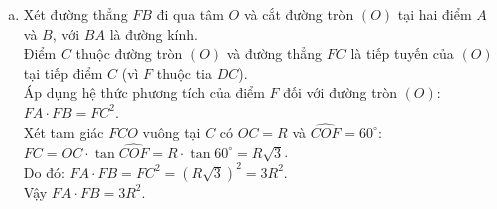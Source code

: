 \begin{bt}
{\begin{enumerate}[a)]
    Từ tính đối xứng và các quan hệ góc trong tam giác $OEF$, đường thẳng $FE$ vuông góc với bán kính tại tiếp điểm trên đường tròn $(O)$, suy ra $FE$ là tiếp tuyến của đường tròn $(O)$.
    \item Xét đường thẳng $FB$ đi qua tâm $O$ và cắt đường tròn $(O)$ tại hai điểm $A$ và $B$, với $BA$ là đường kính.\\
    Điểm $C$ thuộc đường tròn $(O)$ và đường thẳng $FC$ là tiếp tuyến của $(O)$ tại tiếp điểm $C$ (vì $F$ thuộc tia $DC$).\\
    Áp dụng hệ thức phương tích của điểm $F$ đối với đường tròn $(O)$:
    $FA \cdot FB = FC^2$.\\
    Xét tam giác $FCO$ vuông tại $C$ có $OC = R$ và $\widehat{COF} = 60^\circ$:\\
    $FC = OC \cdot \tan \widehat{COF} = R \cdot \tan 60^\circ = R\sqrt{3}$.\\
    Do đó:
    $FA \cdot FB = FC^2 = (R\sqrt{3})^2 = 3R^2$.\\
    Vậy $FA \cdot FB = 3R^2$.
\end{enumerate}
}
\end{bt}

